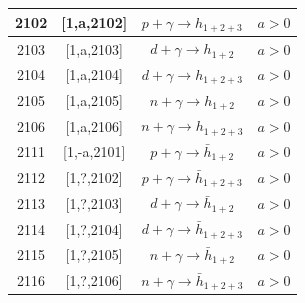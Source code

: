 \documentclass[prd,nofootinbib,eqsecnum,final]{revtex4}
\renewcommand{\(}{\left(}
\renewcommand{\)}{\right)}
\renewcommand{\[}{\left[}
\renewcommand{\]}{\right]}
\begin{document}
\begin{center}
\begin{longtable}{||c|c||c|p{8cm}||}
2102 & [1,a,2102] & $p+\gamma\to h_{1+2+3}$ &  $a>0$
\\\hline
2103 & [1,a,2103] & $d+\gamma\to h_{1+2}$ &  $a>0$
\\\hline
2104 & [1,a,2104] & $d+\gamma\to h_{1+2+3}$ &  $a>0$
\\\hline
2105 & [1,a,2105] & $n+\gamma\to h_{1+2}$ &  $a>0$
\\\hline
2106 & [1,a,2106] & $n+\gamma\to h_{1+2+3}$ &  $a>0$
\\\hline
2111 & [1,-a,2101] & $p+\gamma\to \bar h_{1+2}$ &  $a>0$
\\\hline
2112 & [1,?,2102] & $p+\gamma\to \bar h_{1+2+3}$ &  $a>0$
\\\hline
2113 & [1,?,2103] & $d+\gamma\to \bar h_{1+2}$ &  $a>0$
\\\hline
2114 & [1,?,2104] & $d+\gamma\to \bar h_{1+2+3}$ &  $a>0$
\\\hline
2115 & [1,?,2105] & $n+\gamma\to \bar h_{1+2}$ &  $a>0$
\\\hline
2116 & [1,?,2106] & $n+\gamma\to \bar h_{1+2+3}$ &  $a>0$
\end{longtable}
\end{center}

\clearpage
\end{document}
